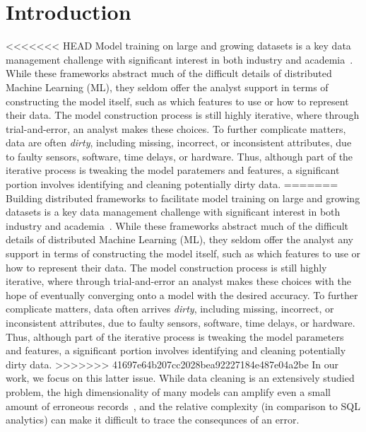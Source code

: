\section{Introduction}
<<<<<<< HEAD
Model training on large and growing datasets is a key data management challenge with significant interest in both industry and academia~\cite{bdas, alexandrov2014stratosphere, crotty2014tupleware, tensor}.
While these frameworks abstract much of the difficult details of distributed Machine Learning (ML), they seldom offer the analyst support in terms of constructing the model itself, such as which features to use or how to represent their data.
The model construction process is still highly iterative, where through trial-and-error, an analyst makes these choices. 
To further complicate matters, data are often \emph{dirty}, including missing, incorrect, or inconsistent attributes, due to faulty sensors, software, time delays, or hardware.
Thus, although part of the iterative process is tweaking the model paratemers and features, a significant portion involves identifying and cleaning potentially dirty data.  
=======
Building distributed frameworks to facilitate model training on large and growing datasets is a key data management challenge with significant interest in both industry and academia~\cite{bdas, alexandrov2014stratosphere, crotty2014tupleware, tensor}.
While these frameworks abstract much of the difficult details of distributed Machine Learning (ML), they seldom offer the analyst any support in terms of constructing the model itself, such as which features to use or how to represent their data.
The model construction process is still highly iterative, where through trial-and-error an analyst makes these choices with the hope of eventually converging onto a model with the desired accuracy.
To further complicate matters, data often arrives \emph{dirty}, including missing, incorrect, or inconsistent attributes, due to faulty sensors, software, time delays, or hardware.
Thus, although part of the iterative process is tweaking the model parameters and features, a significant portion involves identifying and cleaning potentially dirty data.  
>>>>>>> 41697e64b207cc2028bea92227184e487e04a2be
In our work, we focus on this latter issue. 
While data cleaning is an extensively studied problem, the high dimensionality of many models can amplify even a small amount of erroneous records~\cite{xiaofeature}, and the relative complexity (in comparison to SQL analytics) can make it difficult to trace the consequnces of an error.

